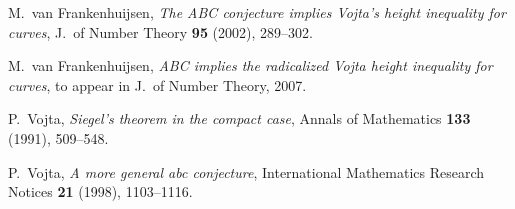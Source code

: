 \documentclass{amsart}
\theoremstyle{definition}\newtheorem{definition}[theorem]{Definition}
\theoremstyle{remark}\newtheorem{remark}[theorem]{Remark}
\numberwithin{equation}{section}
\begin{document}
\begin{thebibliography}{M}
	M.\ van Frankenhuijsen,
\textit{The ABC conjecture implies Vojta's height inequality for curves},
J.\ of Number Theory \textbf{95} (2002), 289--302.

	M.\ van Frankenhuijsen,
\textit{ABC implies the radicalized Vojta height inequality for curves},
to appear in J.\ of Number Theory, 2007.

	P.\ Vojta,
\textit{Siegel's theorem in the compact case},
Annals of Mathematics \textbf{133} (1991), 509--548.

	P.\ Vojta,
\textit{A more general abc conjecture},
International Mathematics Research Notices \textbf{21} (1998), 1103--1116.

\end{thebibliography}
\end{document}
